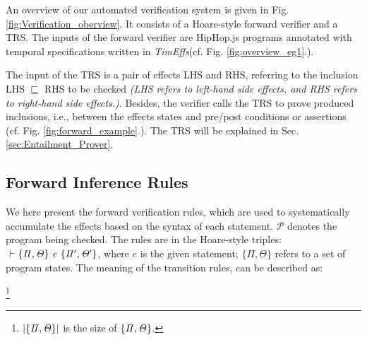 \documentclass[acmsmall,10pt,review]{acmart}
\newcommand{\wbigcup}{\mathop{\widetilde{\bigcup}}\displaylimits}
\newcommand{\env}{\code{\mathcal{V}}}
\newcommand{\es}{\theta}
\newcommand{\timedEffects}{\emph{TimEffs}}
\newcommand{\code}[1]{{\tt{\ensuremath{\m{#1}}}}}
\newcommand{\CONTAIN}{\sqsubseteq}
\newcommand{\m}{\mathit}
\newcommand\figref[1]{Fig. \textcolor{black}{\ref{#1}}.}
\newcommand\secref[1]{Sec. \textcolor{black}{\ref{#1}}}
\newcommand{\timedL}{\code{C^{t}}}
\begin{document}
{An overview of our automated verification system is given in \figref{fig:Verification_oberview} It consists of a Hoare-style forward verifier and a TRS. 
The inputs of the forward verifier are HipHop.js programs annotated with temporal specifications written in \timedEffects (cf. \figref{fig:overview_eg1}). 

The input of the TRS is a pair of effects LHS and RHS, referring to the inclusion LHS \code{\CONTAIN} RHS to be checked 
\textit{(LHS refers to left-hand side effects, and RHS refers to right-hand side effects.)}. Besides, the verifier calls the TRS to prove produced inclusions, i.e., between the effects states and pre/post conditions or assertions (cf. \figref{fig:forward_example}). The TRS will be explained in \secref{sec:Entailment_Prover}. 

\newcommand{\s}[1]{\code{\{ #1\}}}





 

\subsection{Forward Inference Rules}
\label{Forward_Rules}



 We here present the forward verification rules, 
which are used to systematically accumulate the effects based on 
the syntax of each statement.
\code{\mathcal{P}} denotes the program being checked. 
The rules are in the Hoare-style triples: 
\code{\ \vdash \s{ \Pi, \Theta } \ e\ 
\s{\Pi^\prime, \Theta^\prime}},  where 
$e$ is the given statement;
\s{ \Pi, \Theta } refers to a set of program states. 
The meaning of the transition rules, can be described as: 




\vspace{2mm}
\qquad\qquad\quad \code{\s{ \Pi^\prime, \Theta^\prime } = 
\wbigcup_{i{=}0}^{|\s{ \Pi, \Theta }| \text{-} 1}  
\s{\pi_i^\prime, \es_i^\prime} \ \ where\ \ 
 \vdash  \s{\pi_i, \es_i} \ e \ \s{\pi_i^\prime, \es_i^\prime}.} 
\footnote{\code{|\s{ \Pi, \Theta }|} is the 
size of \code{\s{ \Pi, \Theta }}.}
\vspace{3mm}


}
\end{document}
